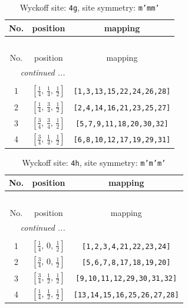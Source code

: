 \documentclass[fleqn,8pt]{jsarticle}
\begin{document}
\renewcommand{\arraystretch}{1.2}
\begin{longtable}{ccc}
\caption{Wyckoff site: {\tt 4g}, site symmetry: {\tt m'mm'}}
 \\
 \hline \hline
No. & position & mapping \\ \hline \endfirsthead

\multicolumn{2}{l}{\tablename\ \thetable{}} \\
 \hline \hline
No. & position & mapping \\ \hline \endhead

 \hline \hline
\multicolumn{2}{r}{\footnotesize\it continued ...} \\ \endfoot

 \hline \hline
\multicolumn{2}{r}{} \\ \endlastfoot

1 & $\left[ \frac{1}{4},\, \frac{1}{4},\, \frac{1}{2} \right]$ & {\tt [1,3,13,15,22,24,26,28]} \\ \hline
2 & $\left[ \frac{1}{4},\, \frac{3}{4},\, \frac{1}{2} \right]$ & {\tt [2,4,14,16,21,23,25,27]} \\ \hline
3 & $\left[ \frac{3}{4},\, \frac{3}{4},\, \frac{1}{2} \right]$ & {\tt [5,7,9,11,18,20,30,32]} \\ \hline
4 & $\left[ \frac{3}{4},\, \frac{1}{4},\, \frac{1}{2} \right]$ & {\tt [6,8,10,12,17,19,29,31]} \\
\end{longtable}
\renewcommand{\arraystretch}{1.2}
\begin{longtable}{ccc}
\caption{Wyckoff site: {\tt 4h}, site symmetry: {\tt m'm'm'}}
 \\
 \hline \hline
No. & position & mapping \\ \hline \endfirsthead

\multicolumn{2}{l}{\tablename\ \thetable{}} \\
 \hline \hline
No. & position & mapping \\ \hline \endhead

 \hline \hline
\multicolumn{2}{r}{\footnotesize\it continued ...} \\ \endfoot

 \hline \hline
\multicolumn{2}{r}{} \\ \endlastfoot

1 & $\left[ \frac{1}{4},\, 0,\, \frac{1}{2} \right]$ & {\tt [1,2,3,4,21,22,23,24]} \\ \hline
2 & $\left[ \frac{3}{4},\, 0,\, \frac{1}{2} \right]$ & {\tt [5,6,7,8,17,18,19,20]} \\ \hline
3 & $\left[ \frac{3}{4},\, \frac{1}{2},\, \frac{1}{2} \right]$ & {\tt [9,10,11,12,29,30,31,32]} \\ \hline
4 & $\left[ \frac{1}{4},\, \frac{1}{2},\, \frac{1}{2} \right]$ & {\tt [13,14,15,16,25,26,27,28]} \\
\end{longtable}
\end{document}
